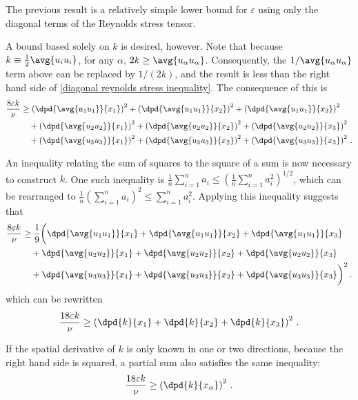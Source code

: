 \documentclass[ccbysa,note]{bmtreport}
\begin{document}
The previous result is a relatively simple lower bound for $\varepsilon$ using only the diagonal terms of the Reynolds stress tensor.

A bound based solely on $k$ is desired, however. Note that because $k \equiv \tfrac{1}{2} \avg{u_i u_i}$, for any $\alpha$, $2 k \geq \avg{u_\alpha u_\alpha}$. Consequently, the $1 / \avg{u_\alpha u_\alpha}$ term above can be replaced by $1 / (2 k)$, and the result is less than the right hand side of \eqref{diagonal reynolds stress inequality}. The consequence of this is
\begin{align}
   \frac{8 \varepsilon k}{\nu} &\geq \left(\dpd{\avg{u_1 u_1}}{x_1}\right)^2 + \left(\dpd{\avg{u_1 u_1}}{x_2}\right)^2 + \left(\dpd{\avg{u_1 u_1}}{x_3}\right)^2 \notag \\
                             &\quad + \left(\dpd{\avg{u_2 u_2}}{x_1}\right)^2 + \left(\dpd{\avg{u_2 u_2}}{x_2}\right)^2 + \left(\dpd{\avg{u_2 u_2}}{x_3}\right)^2 \notag \\
                             &\quad + \left(\dpd{\avg{u_3 u_3}}{x_1}\right)^2 + \left(\dpd{\avg{u_3 u_3}}{x_2}\right)^2 + \left(\dpd{\avg{u_3 u_3}}{x_3}\right)^2 \,.
\end{align}

An inequality relating the sum of squares to the square of a sum is now necessary to construct $k$. One such inequality is $\tfrac{1}{n} \sum_{i = 1}^n a_i \leq \left(\tfrac{1}{n} \sum_{i = 1}^n a_i^2\right)^{1/2}$, which can be rearranged to $\tfrac{1}{n} \left(\sum_{i = 1}^n a_i\right)^2 \leq \sum_{i = 1}^n a_i^2$. Applying this inequality suggests that
\begin{align}
   \frac{8 \varepsilon k}{\nu} &\geq \frac{1}{9} \bigg(\dpd{\avg{u_1 u_1}}{x_1} + \dpd{\avg{u_1 u_1}}{x_2} + \dpd{\avg{u_1 u_1}}{x_3} \notag \\
                             &\quad + \dpd{\avg{u_2 u_2}}{x_1} + \dpd{\avg{u_2 u_2}}{x_2} + \dpd{\avg{u_2 u_2}}{x_3} \notag \\
                             &\quad + \dpd{\avg{u_3 u_3}}{x_1} + \dpd{\avg{u_3 u_3}}{x_2} + \dpd{\avg{u_3 u_3}}{x_3}\bigg)^2 \,.
\end{align}
which can be rewritten
\begin{equation}
   \frac{18 \varepsilon k}{\nu} \geq \left(\dpd{k}{x_1} + \dpd{k}{x_2} + \dpd{k}{x_3}\right)^2 \,.
\end{equation}

If the spatial derivative of $k$ is only known in one or two directions, because the right hand side is squared, a partial sum also satisfies the same inequality:
\begin{equation}
   \frac{18 \varepsilon k}{\nu} \geq \left(\dpd{k}{x_\alpha}\right)^2 \,.
\end{equation}
\end{document}

